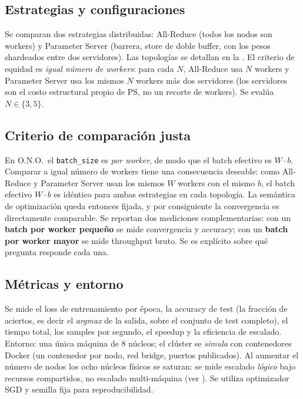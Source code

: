 \documentclass[conference,10pt]{IEEEtran}
\begin{document}



\subsection{Estrategias y configuraciones}
Se comparan dos estrategias distribuidas: All-Reduce (todos los nodos son workers) y
Parameter Server (barrera, store de doble buffer, con los pesos shardeados entre dos
servidores). Las topolog\'ias se detallan en la . El criterio de
equidad es \emph{igual n\'umero de workers}: para cada $N$, All-Reduce usa $N$ workers y
Parameter Server usa los mismos $N$ workers m\'as dos servidores (los servidores son
el costo estructural propio de PS, no un recorte de workers). Se eval\'ua
$N\in\{3,5\}$.



\subsection{Criterio de comparaci\'on justa}\label{sec:fair}
En O.N.O.\ el \texttt{batch\_size} es \emph{por worker}, de modo que el batch efectivo
es $W\cdot b$. Comparar a igual n\'umero de workers tiene una consecuencia deseable: como All-Reduce y Parameter Server usan los
mismos $W$ workers con el mismo $b$, el batch efectivo $W\cdot b$ es id\'entico para
ambas estrategias en cada topolog\'ia. La sem\'antica de optimizaci\'on queda entonces
fijada, y por consiguiente la convergencia es directamente comparable. Se reportan dos
mediciones complementarias: con un \textbf{batch por worker peque\~no} se mide
convergencia y accuracy; con un \textbf{batch por worker mayor} se mide throughput
bruto. Se es expl\'icito sobre qu\'e pregunta responde cada una.

\subsection{M\'etricas y entorno}
Se mide el loss de entrenamiento por \'epoca, la accuracy de test (la fracci\'on
de aciertos, es decir el \emph{argmax} de la salida, sobre el conjunto de test
completo), el tiempo total, los samples por segundo, el speedup y la
eficiencia de escalado. Entorno: una \'unica m\'aquina de 8 n\'ucleos; el cl\'uster se
\emph{simula} con contenedores Docker (un contenedor por nodo, red bridge, puertos
publicados). Al aumentar el n\'umero de nodos los ocho n\'ucleos f\'isicos se saturan:
se mide escalado \emph{l\'ogico} bajo recursos compartidos, no escalado multi-m\'aquina
(ver ). Se utiliza optimizador SGD y semilla fija para
reproducibilidad.
\end{document}
